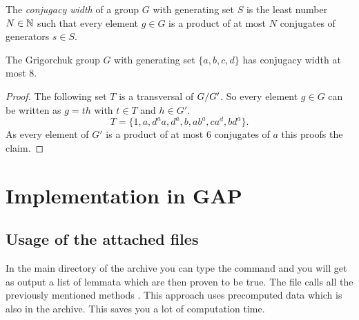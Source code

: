 \documentclass[a4paper,11pt]{amsart}
\begin{document}
\begin{defi}
 The \emph{conjugacy width} of a group $G$ with generating set $S$ 
 is the least number $N\in\mathbb{N}$ such that every element $g\in G$ is a product of
 at most $N$ conjugates of generators $s\in S$.
\end{defi}
\begin{cor}
 The Grigorchuk group $G$ with generating set $\{a,b,c,d\}$ has conjugacy width at most $8$.
\end{cor}
\begin{proof}
 The following set $T$ is a transversal of ${G/G'}$. So every element $g\in G$ can be written as $g=th$ with $t\in T$ and $h\in G'$.
 \[T=\{1,a,d^aa,d^a,b,ab^a,ca^d,bd^a\}.\]
 As every element of $G'$ is a product of at most $6$ conjugates of $a$ this proofs the claim.

\end{proof}








\section{Implementation in GAP}
\subsection{Usage of the attached files}
In the main directory of the archive you can type the command  and 
you will get as output a list of lemmata which are then proven to be true. 
The file calls all the previously mentioned methods .
This approach uses
precomputed data which is also in the archive. This saves you a lot of computation time.
\end{document}

